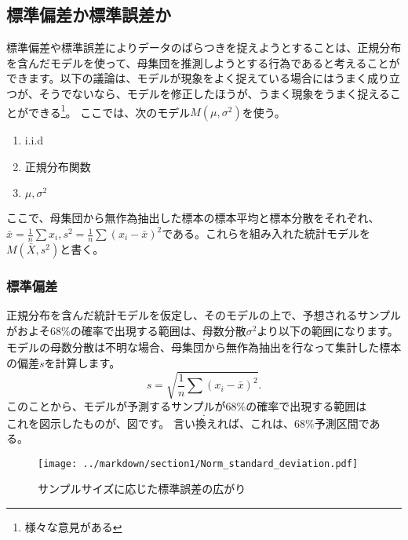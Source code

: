 \documentclass[a4paper,11pt,dvipdfmx]{jsarticle}
\begin{document}
\subsection{標準偏差か標準誤差か}
標準偏差や標準誤差によりデータのばらつきを捉えようとすることは、正規分布を含んだモデルを使って、母集団を推測しようとする行為であると考えることができます。以下の議論は、モデルが現象をよく捉えている場合にはうまく成り立つが、そうでないなら、モデルを修正したほうが、うまく現象をうまく捉えることができる\footnote{様々な意見がある\cite{SUZUKI_SESD,池田郁男2013統計検定を理解せずに使っている人のために,池田郁男2019改訂増補版}}。
ここでは、次のモデル$M(\mu,\sigma^2)$を使う。

\begin{enumerate}
    \item i.i.d
    \item 正規分布関数
    \item $\mu,\sigma^2$
\end{enumerate}
ここで、母集団から無作為抽出した標本の標本平均と標本分散をそれぞれ、$\bar{x}=\frac{1}{n}\sum{x_i},s^2=\frac{1}{n}\sum(x_i-\bar{x})^2$である。これらを組み入れた統計モデルを$M(\bar{X},s^2)$と書く。

\subsubsection{標準偏差}
正規分布を含んだ統計モデルを仮定し、そのモデルの上で、予想されるサンプルがおよそ$68\%$の確率で出現する範囲は、母数分散$\sigma^2$より以下の範囲になります。
\begin{equation*}
    [\mu-\sigma,\mu+\sigma].
\end{equation*}
モデルの母数分散は不明な場合、母集団から無作為抽出を行なって集計した標本の偏差$s$を計算します。
\begin{equation*}
    s = \sqrt{\frac{1}{n}\sum(x_i-\bar{x})^2}.
\end{equation*}
このことから、モデルが予測するサンプルが$68\%$の確率で出現する範囲は
\begin{equation*}
    [\mu-s,\mu+s].
\end{equation*}
これを図示したものが、図です。
言い換えれば、これは、$68\%$予測区間である。


\begin{figure}
    \begin{center}
        \texttt{[image: ../markdown/section1/Norm\_standard\_deviation.pdf]}
        \caption{サンプルサイズに応じた標準誤差の広がり}
    \end{center}
\end{figure}
\end{document}
